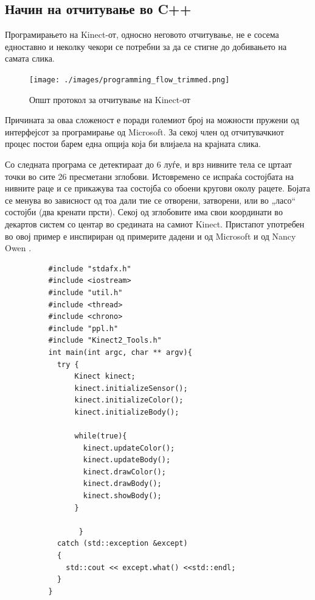 \documentclass[11pt]{article}
\begin{document}
  \subsection{Начин на отчитување во C++}
    Програмирањето на Kinect-от, односно неговото отчитување, не е сосема едноставно и неколку чекори се потребни за да се стигне до добивањето на самата слика.

    \begin{figure}[H]
      \texttt{[image: ./images/programming\_flow\_trimmed.png]}
      \centering
      \caption{Општ протокол за отчитување на Kinect-от}
      \label{fig:programming_flow_trimmed.png}
      \end{figure}

    Причината за оваа сложеност е поради големиот број на можности пружени од интерфејсот за програмирање од Microsoft. За секој член од отчитувачкиот процес постои барем една опција која би влијаела на крајната слика.

    Со следната програма се детектираат до 6 луѓе, и врз нивните тела се цртаат точки во сите 26 пресметани зглобови. Истовремено се испраќа состојбата на нивните раце и се прикажува таа состојба со обоени кругови околу рацете. Бојата се менува во зависност од тоа дали тие се отворени, затворени, или во „ласо“ состојби (два кренати прсти). Секој од зглобовите има свои координати во декартов систем со центар во средината на самиот Kinect. Пристапот употребен во овој пример е инспириран од примерите дадени и од Microsoft и од Nancy Owen \cite{nancyowen}.
    \begin{verbatim}
          #include "stdafx.h"
          #include <iostream>
          #include "util.h"
          #include <thread>
          #include <chrono>
          #include "ppl.h"
          #include "Kinect2_Tools.h"
          int main(int argc, char ** argv){
            try {
                Kinect kinect;
                kinect.initializeSensor();
                kinect.initializeColor();
                kinect.initializeBody();

                while(true){
                  kinect.updateColor();
                  kinect.updateBody();
                  kinect.drawColor();
                  kinect.drawBody();
                  kinect.showBody();
                }

                 }
            catch (std::exception &except)
            {
              std::cout << except.what() <<std::endl;
            }
          }
        \end{verbatim}
\end{document}
